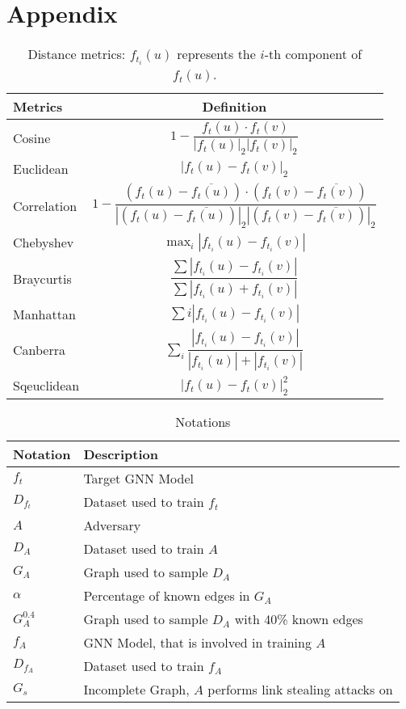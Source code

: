 \chapter*{Appendix}

    \begin{table}[h]
        \centering
        \footnotesize
        \begin{tabular}{l|c}
        \toprule
        Metrics & Definition \\
        \midrule
        Cosine & $1 - \dfrac{f_t(u)\cdot f_t(v)}{\left|f_t(u)\right|_2\left|f_t(v)\right|_2}$ \\
        Euclidean & $\left|f_t(u) - f_t(v)\right|_2$ \\
        Correlation & $1-\dfrac{(f_t(u)-\overline{f_t(u)}) \cdot(f_t(v)-\overline{f_t(v)})}{|(f_t(u)-\overline{f_t(u)})|_{2}|(f_t(v)-\overline{f_t(v)})|_{2}}$ \\
        Chebyshev & $\max _{i}\left|f_{t_i}(u)-f_{t_i}(v)\right|$ \\
        Braycurtis & $\dfrac{\sum\left|f_{t_i}(u)-f_{t_i}(v)\right|} {\sum\left|f_{t_i}(u)+f_{t_i}(v)\right|}$ \\
        Manhattan & $\sum{i}\left|f_{t_i}(u)-f_{t_i}(v)\right|$ \\
        Canberra & $\sum_{i} \dfrac{\left|f_{t_i}(u)-f_{t_i}(v)\right|}{\left|f_{t_i}(u)\right|+\left|f_{t_i}(v)\right|}$ \\
        Sqeuclidean & $\left|f_t(u) - f_t(v)\right|_2^2$ \\
        \bottomrule
        \end{tabular}
        \caption{Distance metrics: $f_{t_i}(u)$ represents the $i$-th component of $f_t(u)$.}
        \label{table:distance}
    \end{table}

    \begin{table}[!h]
        \centering
        \footnotesize
        \begin{tabular}{l|l|}
          \toprule
          Notation & Description \\
          \midrule
          $f_t$ & Target GNN Model \\
          $D_{f_t}$ & Dataset used to train $f_t$ \\
          $A$ & Adversary \\
          $D_A$ & Dataset used to train $A$ \\
          $G_A$ & Graph used to sample $D_A$ \\
          $\alpha$ & Percentage of known edges in $G_A$ \\
          $G_A^{0.4}$ & Graph used to sample $D_A$ with 40\% known edges \\
          $f_A$ & GNN Model, that is involved in training $A$ \\
          $D_{f_A}$ & Dataset used to train $f_A$ \\
          $G_s$ & Incomplete Graph, $A$ performs link stealing attacks on \\
          \bottomrule
        \end{tabular}
        \caption{Notations}
        \label{table:notations}
      \end{table}

